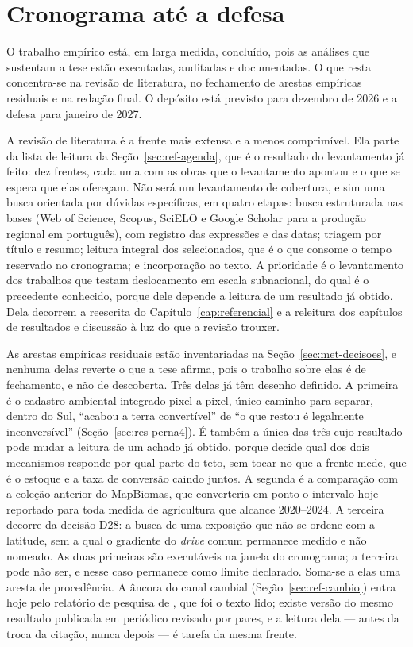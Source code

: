 \chapter{Cronograma até a defesa}
\label{cap:cronograma}

O trabalho empírico está, em larga medida, concluído, pois as análises que
sustentam a tese estão executadas, auditadas e documentadas. O que resta concentra-se na
revisão de literatura, no fechamento de arestas empíricas residuais e na
redação final. O depósito está previsto para dezembro de 2026 e a defesa para
janeiro de 2027.

A revisão de literatura é a frente mais extensa e a menos comprimível. Ela
parte da lista de leitura da Seção~\ref{sec:ref-agenda}, que é o resultado do
levantamento já feito: dez frentes, cada uma com as obras que o levantamento
apontou e o que se espera que elas ofereçam. Não será um levantamento de
cobertura, e sim uma busca orientada por dúvidas específicas, em quatro
etapas: busca estruturada nas bases (Web of Science, Scopus, SciELO e Google
Scholar para a produção regional em português), com registro das expressões e
das datas; triagem por título e resumo; leitura integral dos selecionados, que
é o que consome o tempo reservado no cronograma; e incorporação ao texto. A
prioridade é o levantamento dos trabalhos que testam deslocamento em escala
subnacional, do qual  é o precedente conhecido, porque
dele depende a leitura de um resultado já obtido. Dela decorrem a reescrita do
Capítulo~\ref{cap:referencial} e a releitura dos capítulos de resultados e
discussão à luz do que a revisão trouxer.

As arestas empíricas residuais estão inventariadas na
Seção~\ref{sec:met-decisoes}, e nenhuma delas reverte o que a tese afirma,
pois o trabalho sobre elas é de fechamento, e não de descoberta. Três delas já
têm desenho definido. A primeira é o cadastro ambiental integrado pixel a
pixel, único caminho para separar, dentro do Sul, ``acabou a terra
convertível'' de ``o que restou é legalmente inconversível''
(Seção~\ref{sec:res-perna4}). É também a única das três cujo resultado pode
mudar a leitura de um achado já obtido, porque decide qual dos dois mecanismos
responde por qual parte do teto, sem tocar no que a frente mede, que é o
estoque e a taxa de conversão caindo juntos. A segunda é a comparação com a
coleção anterior do MapBiomas, que converteria em ponto o
intervalo hoje reportado para toda medida de agricultura que alcance
2020--2024. A terceira decorre da decisão D28: a busca de uma exposição que
não se ordene com a latitude, sem a qual o gradiente do \emph{drive} comum
permanece medido e não nomeado. As duas primeiras são executáveis na janela do
cronograma; a terceira pode não ser, e nesse caso permanece como limite
declarado. Soma-se a elas uma aresta de procedência. A âncora do canal cambial
(Seção~\ref{sec:ref-cambio}) entra hoje pelo relatório de pesquisa de
, que foi o texto lido; existe versão do mesmo
resultado publicada em periódico revisado por pares, e a leitura dela ---
antes da troca da citação, nunca depois --- é tarefa da mesma frente.

